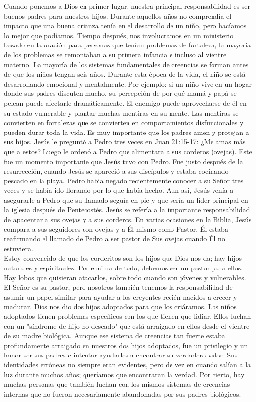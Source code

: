 \documentclass[twoside, 12pt]{book}
\begin{document}
Cuando ponemos a Dios en primer lugar, nuestra principal responsabilidad es ser buenos padres para nuestros hijos. Durante aquellos años no comprendía el impacto que una buena crianza tenía en el desarrollo de un niño, pero hacíamos lo mejor que podíamos. Tiempo después, nos involucramos en un ministerio basado en la oración para personas que tenían problemas de fortaleza; la mayoría de los problemas se remontaban a su primera infancia e incluso al vientre materno. La mayoría de los sistemas fundamentales de creencias se forman antes de que los niños tengan seis años. Durante esta época de la vida, el niño se está desarrollando emocional y mentalmente. Por ejemplo: si un niño vive en un hogar donde sus padres discuten mucho, su percepción de por qué mamá y papá se pelean puede afectarle dramáticamente. El enemigo puede aprovecharse de él en su estado vulnerable y plantar muchas mentiras en su mente. Las mentiras se convierten en fortalezas que se convierten en comportamientos disfuncionales y pueden durar toda la vida. Es muy importante que los padres amen y protejan a sus hijos.
Jesús le preguntó a Pedro tres veces en Juan 21:15-17: ¿Me amas más que a estos? Luego le ordenó a Pedro que alimentara a sus corderos (ovejas). Este fue un momento importante que Jesús tuvo con Pedro. Fue justo después de la resurrección, cuando Jesús se apareció a sus discípulos y estaba cocinando pescado en la playa. Pedro había negado recientemente conocer a su Señor tres veces y se había ido llorando por lo que había hecho. Aun así, Jesús venía a asegurarle a Pedro que su llamado seguía en pie y que sería un líder principal en la iglesia después de Pentecostés. Jesús se refería a la importante responsabilidad de apacentar a sus ovejas y a sus corderos. En varias ocasiones en la Biblia, Jesús compara a sus seguidores con ovejas y a Él mismo como Pastor. Él estaba reafirmando el llamado de Pedro a ser pastor de Sus ovejas cuando Él no estuviera.\\

Estoy convencido de que los corderitos son los hijos que Dios nos da; hay hijos naturales y espirituales. Por encima de todo, debemos ser un pastor para ellos. Hay lobos que quisieran atacarlos, sobre todo cuando son jóvenes y vulnerables. El Señor es su pastor, pero nosotros también tenemos la responsabilidad de asumir un papel similar para ayudar a los creyentes recién nacidos a crecer y madurar. Dios nos dio dos hijos adoptados para que los criáramos. Los niños adoptados tienen problemas específicos con los que tienen que lidiar. Ellos luchan con un "síndrome de hijo no deseado" que está arraigado en ellos desde el vientre de su madre biológica. Aunque ese sistema de creencias tan fuerte estaba profundamente arraigado en nuestros dos hijos adoptados, fue un privilegio y un honor ser sus padres e intentar ayudarles a encontrar su verdadero valor. Sus identidades erróneas no siempre eran evidentes, pero de vez en cuando salían a la luz durante muchos años; queríamos que encontraran la verdad. Por cierto, hay muchas personas que también luchan con los mismos sistemas de creencias internas que no fueron necesariamente abandonadas por sus padres biológicos.\\
\end{document}
